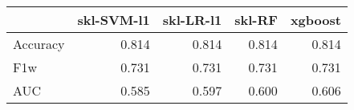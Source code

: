 \begin{tabular}{lrrrr}
\toprule
{} &  skl-SVM-l1 &  skl-LR-l1 &  skl-RF &  xgboost \\
\midrule
Accuracy &       0.814 &      0.814 &   0.814 &    0.814 \\
F1w      &       0.731 &      0.731 &   0.731 &    0.731 \\
AUC      &       0.585 &      0.597 &   0.600 &    0.606 \\
\bottomrule
\end{tabular}
